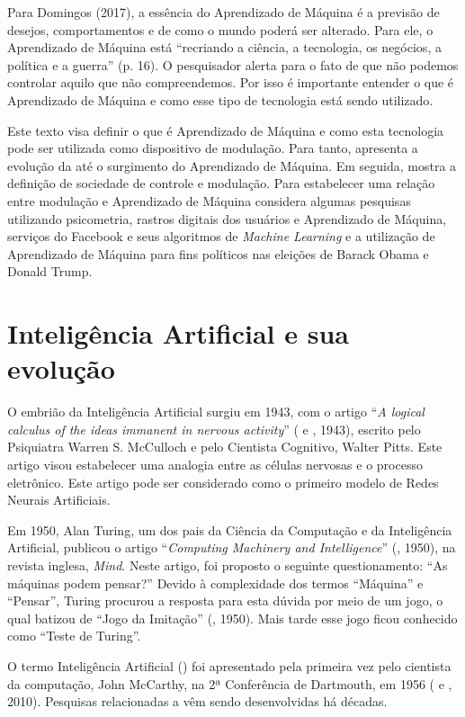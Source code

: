 Para Domingos (2017), a essência do Aprendizado de Máquina é a previsão
de desejos, comportamentos e de como o mundo poderá ser alterado. Para
ele, o Aprendizado de Máquina está ``recriando a ciência, a tecnologia,
os negócios, a política e a guerra'' (p. 16). O pesquisador alerta para
o fato de que não podemos controlar aquilo que não compreendemos. Por
isso é importante entender o que é Aprendizado de Máquina e como esse
tipo de tecnologia está sendo utilizado.

Este texto visa definir o que é Aprendizado de Máquina e como esta
tecnologia pode ser utilizada como dispositivo de modulação. Para tanto,
apresenta a evolução da  até o surgimento do Aprendizado de Máquina.
Em seguida, mostra a definição de sociedade de controle e modulação.
Para estabelecer uma relação entre modulação e Aprendizado de Máquina
considera algumas pesquisas utilizando psicometria, rastros digitais dos
usuários e Aprendizado de Máquina, serviços do Facebook e seus
algoritmos de \emph{Machine Learning} e a utilização de Aprendizado de
Máquina para fins políticos nas eleições de Barack Obama e Donald Trump.

\section{Inteligência Artificial e sua evolução}

O embrião da Inteligência Artificial surgiu em 1943, com o artigo
``\emph{A logical calculus of the ideas immanent in nervous activity}''
( e , 1943), escrito pelo Psiquiatra Warren S. McCulloch e
pelo Cientista Cognitivo, Walter Pitts. Este artigo visou estabelecer
uma analogia entre as células nervosas e o processo eletrônico. Este
artigo pode ser considerado como o primeiro modelo de Redes Neurais
Artificiais.

Em 1950, Alan Turing, um dos pais da Ciência da Computação e da
Inteligência Artificial, publicou o artigo ``\emph{Computing Machinery
and Intelligence}'' (, 1950), na revista inglesa, \emph{Mind}.
Neste artigo, foi proposto o seguinte questionamento: ``As máquinas
podem pensar?'' Devido à complexidade dos termos ``Máquina'' e
``Pensar'', Turing procurou a resposta para esta dúvida por meio de um
jogo, o qual batizou de ``Jogo da Imitação'' (, 1950). Mais tarde
esse jogo ficou conhecido como ``Teste de Turing''.

O termo Inteligência Artificial () foi apresentado pela primeira vez
pelo cientista da computação, John McCarthy, na 2ª Conferência de
Dartmouth, em 1956 ( e , 2010). Pesquisas relacionadas a 
vêm sendo desenvolvidas há décadas.

